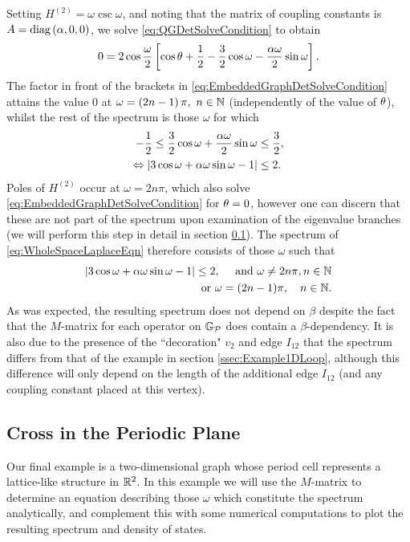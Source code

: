 Setting $H^{(2)} = \omega\csc\omega$, and noting that the matrix of coupling constants is $A=\mathrm{diag}\left( \alpha, 0, 0 \right)$, we solve \eqref{eq:QGDetSolveCondition} to obtain
\begin{align} \label{eq:EmbeddedGraphDetSolveCondition}
	0 = 2\cos\frac{\omega}{2}\left[  \cos\theta + \frac{1}{2} - \frac{3}{2}\cos\omega - \frac{\alpha\omega}{2}\sin\omega  \right].
\end{align}
The factor in front of the brackets in \eqref{eq:EmbeddedGraphDetSolveCondition} attains the value 0 at $\omega=\left( 2n-1 \right)\pi, \ n\in\mathbb{N}$ (independently of the value of $\theta$), whilst the rest of the spectrum is those $\omega$ for which
\begin{align*}
	-\frac{1}{2} \leq \frac{3}{2}\cos\omega + \frac{\alpha\omega}{2}\sin\omega & \leq \frac{3}{2}, \\
	\Leftrightarrow \left\lvert  3\cos\omega + \alpha\omega\sin\omega - 1  \right\rvert &\leq 2. 
\end{align*}
Poles of $H^{(2)}$ occur at $\omega= 2n\pi$, which also solve \eqref{eq:EmbeddedGraphDetSolveCondition} for $\theta=0$, however one can discern that these are not part of the spectrum upon examination of the eigenvalue branches (we will perform this step in detail in section \ref{ssec:ExampleCrossInPlane}).
The spectrum of \eqref{eq:WholeSpaceLaplaceEqn} therefore consists of those $\omega$ such that
\begin{align*}
	\left\lvert  3\cos\omega + \alpha\omega\sin\omega - 1  \right\rvert \leq 2,
	\quad\text{ and }\omega\neq 2n\pi, n\in\mathbb{N} \\
	\text{or} \ \omega = (2n-1)\pi, \quad n\in\mathbb{N}.
\end{align*}
As was expected, the resulting spectrum does not depend on $\beta$ despite the fact that the $M$-matrix for each operator on $\mathbb{G}_{\mathcal{P}}$ does contain a $\beta$-dependency.
It is also due to the presence of the ``decoration" $v_2$ and edge $I_{12}$ that the spectrum differs from that of the example in section \ref{ssec:Example1DLoop}, although this difference will only depend on the length of the additional edge $I_{12}$ (and any coupling constant placed at this vertex).

\subsection{Cross in the Periodic Plane} \label{ssec:ExampleCrossInPlane}
Our final example is a two-dimensional graph whose period cell represents a lattice-like structure in $\mathbb{R}^2$.
In this example we will use the $M$-matrix to determine an equation describing those $\omega$ which constitute the spectrum analytically, and complement this with some numerical computations to plot the resulting spectrum and density of states.

